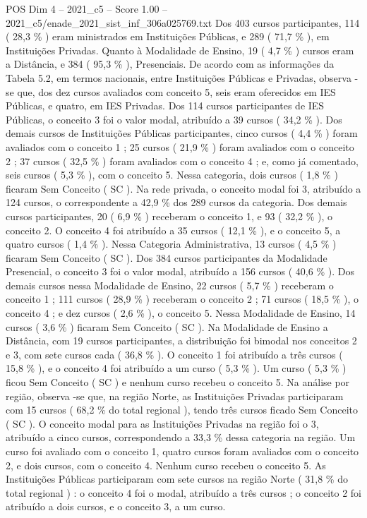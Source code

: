 \begin{textsample}{POS Dim 4 – 2021\_c5 – Score 1.00 – 2021\_c5/enade\_2021\_sist\_inf\_306a025769.txt}
Dos 403 cursos participantes, 114 ( 28,3 \% ) eram ministrados em Instituições Públicas, e 289 ( 71,7 \% ), em Instituições Privadas.
Quanto à Modalidade de Ensino, 19 ( 4,7 \% ) cursos eram a Distância, e 384 ( 95,3 \% ), Presenciais.
De acordo com as informações da Tabela 5.2, em termos nacionais, entre Instituições Públicas e Privadas, observa -se que, dos dez cursos avaliados com conceito 5, seis eram oferecidos em IES Públicas, e quatro, em IES Privadas.
Dos 114 cursos participantes de IES Públicas, o conceito 3 foi o valor modal, atribuído a 39 cursos ( 34,2 \% ).
Dos demais cursos de Instituições Públicas participantes, cinco cursos ( 4,4 \% ) foram avaliados com o conceito 1 ; 25 cursos ( 21,9 \% ) foram avaliados com o conceito 2 ; 37 cursos ( 32,5 \% ) foram avaliados com o conceito 4 ; e, como já comentado, seis cursos ( 5,3 \% ), com o conceito 5.
Nessa categoria, dois cursos ( 1,8 \% ) ficaram Sem Conceito ( SC ).
Na rede privada, o conceito modal foi 3, atribuído a 124 cursos, o correspondente a 42,9 \% dos 289 cursos da categoria.
Dos demais cursos participantes, 20 ( 6,9 \% ) receberam o conceito 1, e 93 ( 32,2 \% ), o conceito 2.
O conceito 4 foi atribuído a 35 cursos ( 12,1 \% ), e o conceito 5, a quatro cursos ( 1,4 \% ).
Nessa Categoria Administrativa, 13 cursos ( 4,5 \% ) ficaram Sem Conceito ( SC ).
Dos 384 cursos participantes da Modalidade Presencial, o conceito 3 foi o valor modal, atribuído a 156 cursos ( 40,6 \% ).
Dos demais cursos nessa Modalidade de Ensino, 22 cursos ( 5,7 \% ) receberam o conceito 1 ; 111 cursos ( 28,9 \% ) receberam o conceito 2 ; 71 cursos ( 18,5 \% ), o conceito 4 ; e dez cursos ( 2,6 \% ), o conceito 5.
Nessa Modalidade de Ensino, 14 cursos ( 3,6 \% ) ficaram Sem Conceito ( SC ).
Na Modalidade de Ensino a Distância, com 19 cursos participantes, a distribuição foi bimodal nos conceitos 2 e 3, com sete cursos cada ( 36,8 \% ).
O conceito 1 foi atribuído a três cursos ( 15,8 \% ), e o conceito 4 foi atribuído a um curso ( 5,3 \% ).
Um curso ( 5,3 \% ) ficou Sem Conceito ( SC ) e nenhum curso recebeu o conceito 5.
Na análise por região, observa -se que, na região Norte, as Instituições Privadas participaram com 15 cursos ( 68,2 \% do total regional ), tendo três cursos ficado Sem Conceito ( SC ).
O conceito modal para as Instituições Privadas na região foi o 3, atribuído a cinco cursos, correspondendo a 33,3 \% dessa categoria na região.
Um curso foi avaliado com o conceito 1, quatro cursos foram avaliados com o conceito 2, e dois cursos, com o conceito 4.
Nenhum curso recebeu o conceito 5.
As Instituições Públicas participaram com sete cursos na região Norte ( 31,8 \% do total regional ) : o conceito 4 foi o modal, atribuído a três cursos ; o conceito 2 foi atribuído a dois cursos, e o conceito 3, a um curso.

\end{textsample}
